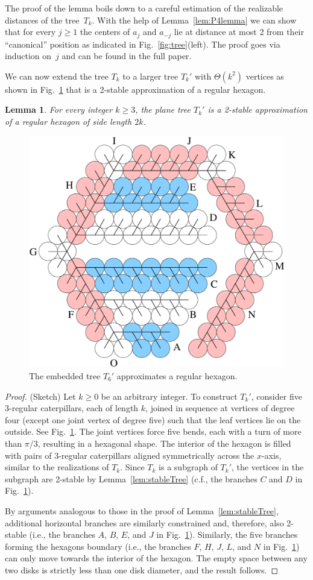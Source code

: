 \documentclass{article}
\theoremstyle{plain}%
\newtheorem{lemma}{Lemma}
\begin{document}
The proof of the lemma boils down to a careful estimation of the realizable distances
of the tree~$T_k$. With the help of Lemma~\ref{lem:P4lemma} we can show that
for every $j\ge 1$ the centers of $a_j$ and $a_{-j}$ lie at distance
at most 2 from their ``canonical'' position as indicated
in Fig.~\ref{fig:tree}(left). The proof goes via induction on~$j$ and
can be found in the full paper.

We can now extend the tree $T_k$ to a larger tree $T_k'$ with $\Theta(k^2)$ vertices as shown in Fig.~\ref{fig:hexagons}
that is a 2-stable approximation of a regular hexagon.
\begin{lemma}\label{lem:stablehex}
For every integer $k\geq 3$, the plane tree $T_k'$
is a 2-stable approximation of a regular hexagon of side length $2k$.
\end{lemma}
\begin{figure}
\centering
\includegraphics[width=.35\textwidth]{block3c}
\caption{The embedded tree $T_6'$ approximates a regular hexagon.}
\label{fig:hexagons}
\end{figure}
\begin{proof} (Sketch)
Let $k\geq 0$ be an arbitrary integer. To construct $T_k'$, consider five 3-regular
caterpillars, each of length $k$, joined in sequence at vertices of degree four
(except one joint vertex of degree five)
such that the leaf vertices lie on the outside. See Fig.~\ref{fig:hexagons}.
The joint vertices force five bends, each with a turn of more than $\pi/3$,
resulting in a hexagonal shape. The interior of the hexagon is filled
with pairs of 3-regular caterpillars aligned symmetrically across the
$x$-axis, similar to the realizations of $T_k$.
Since $T_k$ is a subgraph of $T_k'$,
the vertices in the subgraph are 2-stable
by Lemma~\ref{lem:stableTree} (c.f., the branches $C$ and $D$ in Fig.~\ref{fig:hexagons}).

By arguments analogous to those in the proof of Lemma~\ref{lem:stableTree},
additional horizontal branches are similarly constrained and, therefore,
also 2-stable (i.e., the branches $A$, $B$, $E$, and $J$ in Fig.~\ref{fig:hexagons}).
Similarly, the five branches forming the hexagons boundary (i.e., the branches $F$, $H$, $J$, $L$,
and $N$ in Fig.~\ref{fig:hexagons}) can only move towards the interior of the hexagon.
The empty space between any two disks is strictly less than one disk diameter,
and the result follows.
\end{proof}
\end{document}
